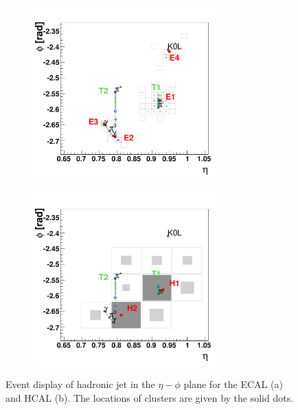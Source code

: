 \begin{figure}[tbh]
\begin{subfigure}{0.45\textwidth}
\centering
\includegraphics[width=2.8in]{figures/PFb.pdf}
\caption{}
\end{subfigure}
\begin{subfigure}{0.45\textwidth}
\centering
\includegraphics[width=2.8in]{figures/PFc.pdf}
\caption{}
\end{subfigure}
\caption{Event display of hadronic jet in the $\eta-\phi$ plane for the ECAL (a) and HCAL (b). The locations of clusters are given by the solid dots.}
\label{fig:pf2}
\end{figure}

